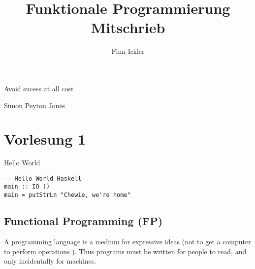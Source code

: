 \documentclass{article}
\title{Funktionale Programmierung Mitschrieb}
\author{Finn Ickler}
\begin{document}
\maketitle
\epigraph{\glqq Avoid sucess at all cost \grqq}{Simon Peyton Jones}
\listoflistings
\section{Vorlesung 1}
\begin{listing}
\caption{Hello World}
\begin{verbatim}
-- Hello World Haskell
main :: IO ()
main = putStrLn "Chewie, we're home"
\end{verbatim}
\end{listing}
\subsection{Functional Programming (FP)}
A programming language is a medium for expressive ideas (not to get a computer to perform operations ). Thus programs must be written for people to read, and only incidentally for machines.
\end{document}
